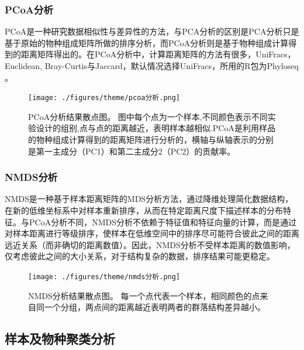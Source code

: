 \documentclass[a4paper,10pt]{article}
\numberwithin{figure}{section}
\numberwithin{table}{section}
\begin{document}
\subsubsection{PCoA分析}
\label{Subsubsec：PCoA}
PCoA是一种研究数据相似性与差异性的方法，与PCA分析的区别是PCA分析只是基于原始的物种组成矩阵所做的排序分析，而PCoA分析则是基于物种组成计算得到的距离矩阵得出的。在PCoA分析中，计算距离矩阵的方法有很多，UniFracs，Euclidean, Bray-Curtis与Jaccard，默认情况选择UniFracs，所用的R包为Phyloseq \cite{Mcmurdie2013phyloseq}。
\begin{figure}[H]
\centering
\label{Fig:PCOA}
\captionsetup{width=.8\textwidth,singlelinecheck = false, justification=justified}
 \texttt{[image: ./figures/theme/pcoa分析.png]}  
   \caption{PCoA分析结果散点图。 图中每个点为一个样本,不同颜色表示不同实验设计的组别,点与点的距离越近，表明样本越相似.PCoA是利用样品的物种组成计算得到的距离矩阵进行分析的，横轴与纵轴表示的分别是第一主成分（PC1）和第二主成分2（PC2）的贡献率。}
\end{figure}
\newpage
\subsubsection{NMDS分析}
\label{Subsubsec：NMDS}
NMDS是一种基于样本距离矩阵的MDS分析方法，通过降维处理简化数据结构，在新的低维坐标系中对样本重新排序，从而在特定距离尺度下描述样本的分布特征。与PCoA分析不同，NMDS分析不依赖于特征值和特征向量的计算，而是通过对样本距离进行等级排序，使样本在低维空间中的排序尽可能符合彼此之间的距离远近关系（而非确切的距离数值）。因此，NMDS分析不受样本距离的数值影响，仅考虑彼此之间的大小关系，对于结构复杂的数据，排序结果可能更稳定。
\begin{figure}[H]
\centering
\label{Fig:NMDS}
\captionsetup{width=.8\textwidth,singlelinecheck = false, justification=justified}
 \texttt{[image: ./figures/theme/nmds分析.png]}  
   \caption{NMDS分析结果散点图。 每一个点代表一个样本，相同颜色的点来自同一个分组，两点间的距离越近表明两者的群落结构差异越小。}
\end{figure}
\newpage
\subsection{样本及物种聚类分析}
\label{Subsec: clustering}
\end{document}
